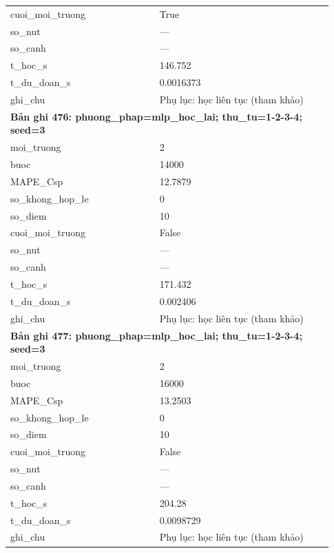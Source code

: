 \begin{longtable}{p{0.43\linewidth}p{0.50\linewidth}}
cuoi\_\allowbreak moi\_\allowbreak truong & True \\
so\_\allowbreak nut & — \\
so\_\allowbreak canh & — \\
t\_\allowbreak hoc\_\allowbreak s & 146.752 \\
t\_\allowbreak du\_\allowbreak doan\_\allowbreak s & 0.0016373 \\
ghi\_\allowbreak chu & Phụ lục: học liên tục (tham khảo) \\
\midrule
\multicolumn{2}{p{0.95\linewidth}}{\textbf{Bản ghi 476: phuong\_phap=mlp\_hoc\_lai; thu\_tu=1-2-3-4; seed=3}} \\
moi\_\allowbreak truong & 2 \\
buoc & 14000 \\
MAPE\_\allowbreak Csp & 12.7879 \\
so\_\allowbreak khong\_\allowbreak hop\_\allowbreak le & 0 \\
so\_\allowbreak diem & 10 \\
cuoi\_\allowbreak moi\_\allowbreak truong & False \\
so\_\allowbreak nut & — \\
so\_\allowbreak canh & — \\
t\_\allowbreak hoc\_\allowbreak s & 171.432 \\
t\_\allowbreak du\_\allowbreak doan\_\allowbreak s & 0.002406 \\
ghi\_\allowbreak chu & Phụ lục: học liên tục (tham khảo) \\
\midrule
\multicolumn{2}{p{0.95\linewidth}}{\textbf{Bản ghi 477: phuong\_phap=mlp\_hoc\_lai; thu\_tu=1-2-3-4; seed=3}} \\
moi\_\allowbreak truong & 2 \\
buoc & 16000 \\
MAPE\_\allowbreak Csp & 13.2503 \\
so\_\allowbreak khong\_\allowbreak hop\_\allowbreak le & 0 \\
so\_\allowbreak diem & 10 \\
cuoi\_\allowbreak moi\_\allowbreak truong & False \\
so\_\allowbreak nut & — \\
so\_\allowbreak canh & — \\
t\_\allowbreak hoc\_\allowbreak s & 204.28 \\
t\_\allowbreak du\_\allowbreak doan\_\allowbreak s & 0.0098729 \\
ghi\_\allowbreak chu & Phụ lục: học liên tục (tham khảo) \\

\end{longtable}
